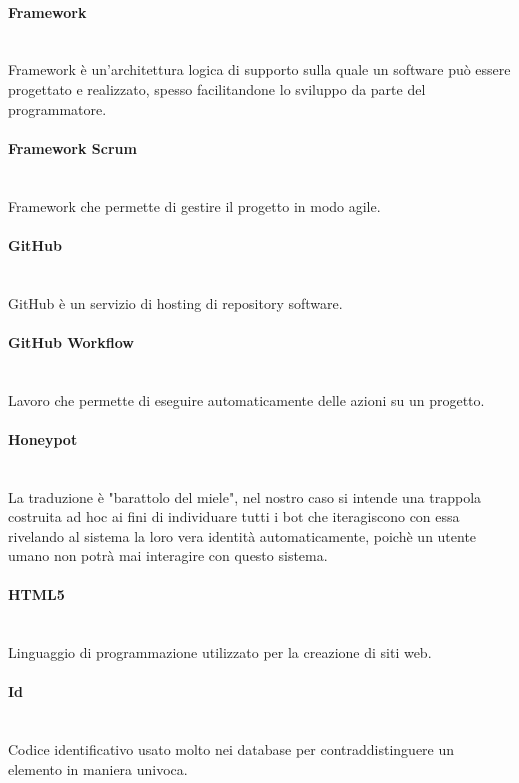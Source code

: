\paragraph{Framework}~\smallskip \\
Framework è un'architettura logica di supporto sulla quale un software può essere progettato e realizzato, spesso facilitandone lo sviluppo da parte del programmatore.

\paragraph{Framework Scrum}~\smallskip \\
Framework che permette di gestire il progetto in modo agile.

\paragraph{GitHub}~\smallskip \\
GitHub è un servizio di hosting di repository software.

\paragraph{GitHub Workflow}~\smallskip \\
Lavoro che permette di eseguire automaticamente delle azioni su un progetto.

\paragraph{Honeypot}~\smallskip \\
La traduzione è "barattolo del miele", nel nostro caso si intende una trappola costruita ad hoc ai fini di individuare tutti i bot che iteragiscono con essa rivelando al sistema la loro vera identità automaticamente, poichè un utente umano non potrà mai interagire con questo sistema.

\paragraph{HTML5}~\smallskip \\
Linguaggio di programmazione utilizzato per la creazione di siti web.

\paragraph{Id}~\smallskip \\
Codice identificativo usato molto nei database per contraddistinguere un elemento in maniera univoca.

